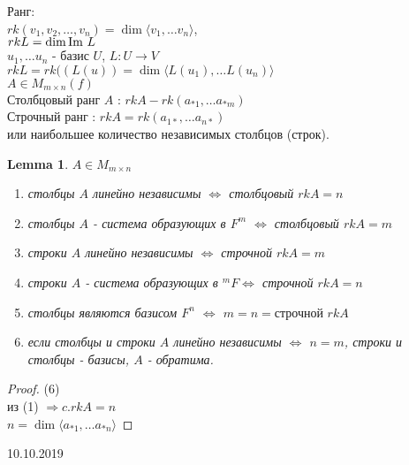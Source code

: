 \documentclass[11pt]{book}
\newcommand{\im}{{\mathop{\text{\rm Im}}}~}
\theoremstyle{definition}
\theoremstyle{plain}
\theoremstyle{plain}
\newtheorem*{lm}{Lemma}
\theoremstyle{definition}
\theoremstyle{remark}
\begin{document}
\begin{defn}Ранг:\\
    $rk (v_1, v_2 , \ldots , v_n) = \dim \langle v_1, \ldots v_n \rangle $, \\
    $rk L = \dim \im L$\\
    $u_1, \ldots u_n $ - базис $U$, $L: U \to V$ \\
    $rk L = rk ((L(u)) = \dim \langle L(u_1), \ldots L(u_n) \rangle $\\
    $A \in M _ {m \times n} (f)$\\
    Столбцовый ранг  $A$ : $rk A - rk(a_{*1}, \ldots a_{*m})$\\
    Строчный ранг : $rk A = rk (a_{1*}, \ldots a_{n*})$\\
    или наибольшее количество независимых столбцов (строк).
\end{defn}
\begin{lm}
    $A \in M_{m \times n}$
     \begin{enumerate}
	 \item столбцы $A$ линейно независимы $\Leftrightarrow$   столбцовый $rk A = n$ 
	 \item столбцы $A$  - система образующих в $F^m$ $\Leftrightarrow$  столбцовый $rk A = m$
	 \item строки $A$ линейно независимы $\Leftrightarrow$ строчной $rk A = m$ 
	 \item строки $A$  - система образующих в $^m F \Leftrightarrow$ строчной $ rk A = n$ 
	 \item столбцы являются базисом $F^n$ $\Leftrightarrow$ $m = n =  \mbox{строчной }rk A$
	 \item если столбцы и строки  $A$ линейно независимы $\Leftrightarrow$ $n = m $, строки и столбцы - базисы, $A$ - обратима.
    \end{enumerate}
\end{lm}
\begin{proof}
    (6)\\
    из (1) $\Rightarrow  c.rk A = n $\\
    $n = \dim \langle a_{*1}, \ldots a_{*n} \rangle $
\end{proof}

10.10.2019
\end{document}
